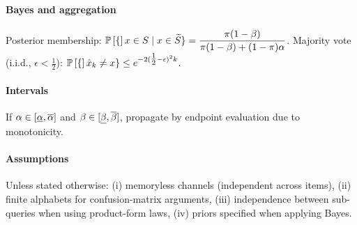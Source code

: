 \paragraph{Bayes and aggregation}
Posterior membership: $\displaystyle \mathbb{P}\left[\{\right]x\in S\mid x\in \widetilde{S}\} = \frac{\pi(1-\beta)}{\pi(1-\beta)+(1-\pi)\alpha}$.  
Majority vote (i.i.d., $\epsilon<\tfrac12$): $\mathbb{P}\left[\{\right]\hat{x}_k\neq x\} \le e^{-2(\tfrac12-\epsilon)^2 k}$.

\paragraph{Intervals}
If $\alpha\in[\underline{\alpha},\overline{\alpha}]$ and $\beta\in[\underline{\beta},\overline{\beta}]$, propagate by endpoint evaluation due to monotonicity.

\paragraph{Assumptions}
Unless stated otherwise: (i) memoryless channels (independent across items), (ii) finite alphabets for confusion-matrix arguments, (iii) independence between sub-queries when using product-form laws, (iv) priors specified when applying Bayes.


